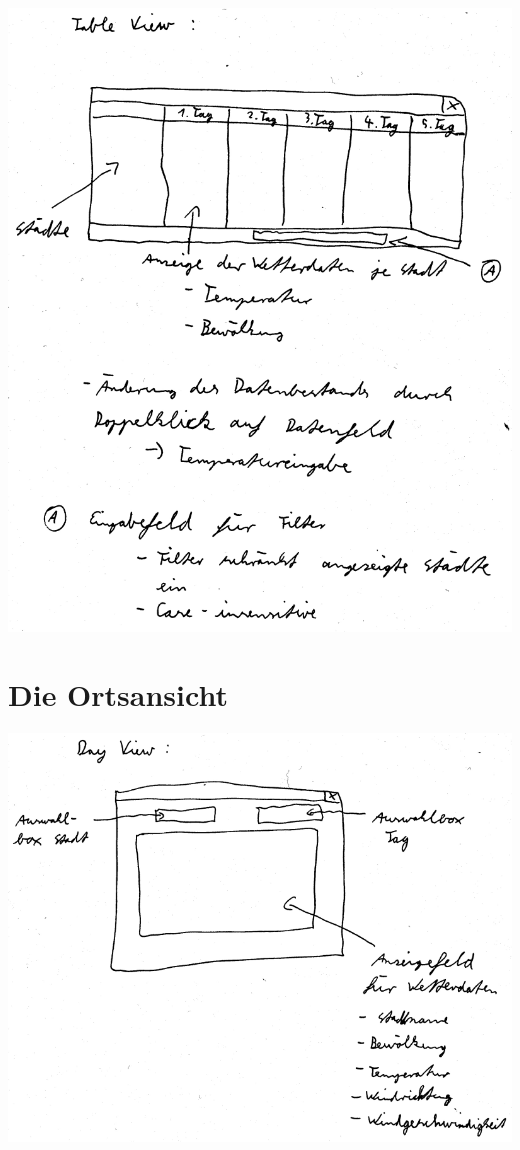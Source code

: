 \documentclass[11pt,a4paper]{scrreprt}
\begin{document}
\begin{center}
\includegraphics[width=14cm]{table_view.png}
\end{center}

\section{Die Ortsansicht}

\begin{center}
\includegraphics[width=14cm]{day_view.png}
\end{center}
\end{document}
